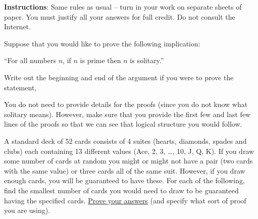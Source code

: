 \documentclass[10pt]{exam}
\begin{document}
\noindent \textbf{Instructions}: Same rules as usual -- turn in your work on separate sheets of paper.  You must justify all your answers for full credit.  Do not consult the Internet.

\begin{questions}

  \question[9] Suppose that you would like to prove the following implication:
  \begin{center}
  ``For all numbers $n$, if $n$ is prime then $n$ is solitary.''
  \end{center}
  Write out the beginning and end of the argument if you were to prove the statement,
  You do not need to provide details for the proofs (since you do not know what solitary means). However, make sure that you provide the first few and last few lines of the proofs so that we can see that logical structure you would follow.



  \question[9] A standard deck of 52 cards consists of 4 suites (hearts, diamonds, spades and clubs) each containing 13 different values (Ace, 2, 3, \ldots, 10, J, Q, K).  If you draw some number of cards at random you might or might not have a pair (two cards with the same value) or three cards all of the same suit.  However, if you draw enough cards, you will be guaranteed to have these.  For each of the following, find the smallest number of cards you would need to draw to be guaranteed having the specified cards.  \underline{Prove your answers} (and specify what sort of proof you are using).
  \begin{parts}

\end{parts}
\end{questions}
\end{document}
